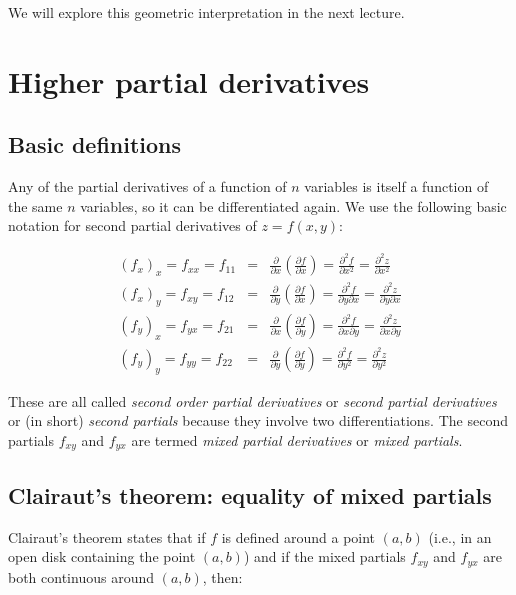 \documentclass[10pt]{amsart}
\begin{document}
We will explore this geometric interpretation in the next lecture.

\section{Higher partial derivatives}

\subsection{Basic definitions}

Any of the partial derivatives of a function of $n$ variables is
itself a function of the same $n$ variables, so it can be
differentiated again. We use the following basic notation for second
partial derivatives of $z = f(x,y)$:

\begin{eqnarray*}
  (f_x)_x = f_{xx} = f_{11} & = & \frac{\partial}{\partial x}\left(\frac{\partial f}{\partial x}\right) = \frac{\partial^2f}{\partial x^2} = \frac{\partial^2 z}{\partial x^2}\\
  (f_x)_y = f_{xy} = f_{12} & = & \frac{\partial}{\partial y}\left(\frac{\partial f}{\partial x}\right) = \frac{\partial^2f}{\partial y \partial x} = \frac{\partial^2 z}{\partial y \partial x}\\
  (f_y)_x = f_{yx} = f_{21} & = & \frac{\partial}{\partial x}\left(\frac{\partial f}{\partial y}\right) = \frac{\partial^2f}{\partial x \partial y} = \frac{\partial^2z}{\partial x \partial y}\\
  (f_y)_y = f_{yy} = f_{22} & = & \frac{\partial}{\partial y}\left(\frac{\partial f}{\partial y}\right) = \frac{\partial^2 f}{\partial y^2} = \frac{\partial^2z}{\partial y^2}
\end{eqnarray*}

These are all called {\em second order partial derivatives} or {\em
second partial derivatives} or (in short) {\em second partials}
because they involve two differentiations. The second partials
$f_{xy}$ and $f_{yx}$ are termed {\em mixed partial derivatives} or
{\em mixed partials}.

\subsection{Clairaut's theorem: equality of mixed partials}

Clairaut's theorem states that if $f$ is defined around a point
$(a,b)$ (i.e., in an open disk containing the point $(a,b)$) and if
the mixed partials $f_{xy}$ and $f_{yx}$ are both continuous around
$(a,b)$, then:
\end{document}
